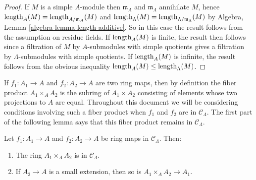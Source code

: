 \begin{proof}
If $M$ is a simple $A$-module then $\mathfrak{m}_{A}$ and 
$\mathfrak{m}_{\Lambda}$ annihilate $M$, hence $\textnormal{length}_{A}(M) = 
\textnormal{length}_{A/\mathfrak{m}_A}(M)$ and 
$\textnormal{length}_{\Lambda}(M) = 
\textnormal{length}_{\Lambda/\mathfrak{m}_{\Lambda}}(M)$ by
Algebra, Lemma \ref{algebra-lemma-length-additive}.
So in this case the result follows from the 
assumption on residue fields.  If $\textnormal{length}_{A}(M)$ is finite, the 
result then follows since a filtration of $M$ by $A$-submodules with simple 
quotients gives a filtration by $\Lambda$-submodules with simple quotients. If 
$\textnormal{length}_{A}(M)$ is infinite, the result follows from the obvious 
inequality $\textnormal{length}_{A}(M) \leq \textnormal{length}_{\Lambda}(M)$.
\end{proof}

\noindent
If $f_1: A_1 \rightarrow A$ and $f_2: A_2 \rightarrow A$ are two ring maps, 
then by definition the fiber product $A_1 \times_{A} A_2$ is the subring of 
$A_1 \times A_2$ consisting of elements whose two projections to $A$ are equal. 
Throughout this document we will be considering conditions involving such a 
fiber product when $f_1$ and $f_2$ are in $\mathcal C_{\Lambda}$.  The first 
part of the following lemma says that this fiber product remains in $\mathcal 
C_{\Lambda}$.
\begin{lemma}
\label{lemma-fiber-product-CLambda}
Let $f_1 : A_1 \rightarrow A$ and $f_2 : A_2 \rightarrow A$ be ring maps in 
$\mathcal C_{\Lambda}$. Then:
\begin{enumerate}
\item The ring $A_1 \times_{A} A_2$ is in $\mathcal C_{\Lambda}$.
\item If $A_2 \rightarrow A$ is a small extension, then so is $A_1 \times_{A} 
A_2 \rightarrow A_1$.
\end{enumerate}
\end{lemma}

